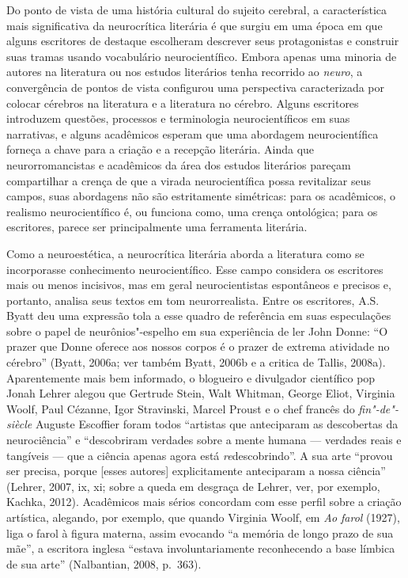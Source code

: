Do ponto de vista de uma história cultural do sujeito cerebral, a
característica mais significativa da neurocrítica literária é que surgiu
em uma época em que alguns escritores de destaque escolheram descrever
seus protagonistas e construir suas tramas usando vocabulário
neurocientífico. Embora apenas uma minoria de autores na literatura ou
nos estudos literários tenha recorrido ao \emph{neuro}, a convergência
de pontos de vista configurou uma perspectiva caracterizada por colocar
cérebros na literatura e a literatura no cérebro. Alguns escritores
introduzem questões, processos e terminologia neurocientíficos em suas
narrativas, e alguns acadêmicos esperam que uma abordagem
neurocientífica forneça a chave para a criação e a recepção literária.
Ainda que neurorromancistas e acadêmicos da área dos estudos literários pareçam compartilhar
a crença de que a virada neurocientífica possa revitalizar seus campos,
suas abordagens não são estritamente simétricas: para os acadêmicos, o
realismo neurocientífico é, ou funciona como, uma crença ontológica;
para os escritores, parece ser principalmente uma ferramenta literária.

Como a neuroestética, a neurocrítica literária aborda a literatura como
se incorporasse conhecimento neurocientífico. Esse campo considera os
escritores mais ou menos incisivos, mas em geral neurocientistas
espontâneos e precisos e, portanto, analisa seus textos em tom
neurorrealista. Entre os escritores, A.S. Byatt deu uma expressão tola a
esse quadro de referência em suas especulações sobre o papel de
neurônios"-espelho em sua experiência de ler John Donne: ``O prazer que
Donne oferece aos nossos corpos é o prazer de extrema atividade no
cérebro'' (Byatt, 2006a; ver também Byatt, 2006b e a critica de Tallis,
2008a). Aparentemente mais bem informado, o blogueiro e divulgador
científico pop Jonah Lehrer alegou que Gertrude Stein, Walt Whitman,
George Eliot, Virginia Woolf, Paul Cézanne, Igor Stravinski, Marcel
Proust e o chef francês do \emph{fin"-de"-siècle} Auguste Escoffier foram
todos ``artistas que anteciparam as descobertas da neurociência'' e
``descobriram verdades sobre a mente humana --- verdades reais e
tangíveis --- que a ciência apenas agora está \emph{re}descobrindo''. A
sua arte ``provou ser precisa, porque {[}esses autores{]} explicitamente
anteciparam a nossa ciência'' (Lehrer, 2007, ix, xi; sobre a queda em
desgraça de Lehrer, ver, por exemplo, Kachka, 2012). Acadêmicos mais
sérios concordam com esse perfil sobre a criação artística, alegando,
por exemplo, que quando Virginia Woolf, em \emph{Ao farol} (1927), liga
o farol à figura materna, assim evocando ``a memória de longo prazo de
sua mãe'', a escritora inglesa ``estava involuntariamente reconhecendo a
base límbica de sua arte'' (Nalbantian, 2008, p.~363).

